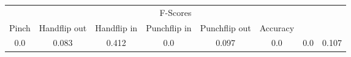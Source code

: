 \documentclass{standalone}
\begin{document}
 
 \begin{tabular}{|c|c|c|c|c|c|c ||c|}
\cline{1-8}\multicolumn{8}{|c|}{F-Scores} \\ 
\cline{1-8}Pinch & Handflip out & Handflip in & Punchflip in & Punchflip out & Accuracy\\ 
\cline{1-8}0.0 & 0.083 & 0.412 & 0.0 & 0.097 & 0.0 & 0.0 & 0.107\\ 
 \cline{1-8}\hline \end{tabular}
 
\end{document}
